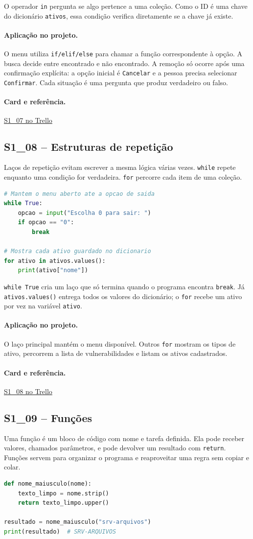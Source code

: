 \documentclass[11pt,a4paper]{article}
\newcommand{\projeto}{\paragraph{Aplicação no projeto.}}
\newcommand{\referencia}[2]{\paragraph{Card e referência.}\href{#1}{#2}}
\newcommand{\cardsection}[1]{\Needspace{12\baselineskip}\subsection{#1}}
\begin{document}
O operador \texttt{in} pergunta se algo pertence a uma coleção. Como o ID é uma chave do dicionário \texttt{ativos}, essa condição verifica diretamente se a chave já existe.

\projeto
O menu utiliza \texttt{if/elif/else} para chamar a função correspondente à opção. A busca decide entre encontrado e não encontrado. A remoção só ocorre após uma confirmação explícita: a opção inicial é \texttt{Cancelar} e a pessoa precisa selecionar \texttt{Confirmar}. Cada situação é uma pergunta que produz verdadeiro ou falso.

\referencia{https://trello.com/c/QvZa8m7a}{S1\_07 no Trello}

\cardsection{S1\_08 -- Estruturas de repetição}

Laços de repetição evitam escrever a mesma lógica várias vezes. \texttt{while} repete enquanto uma condição for verdadeira. \texttt{for} percorre cada item de uma coleção.

\begin{lstlisting}[language=Python,caption={while e for}]
# Mantem o menu aberto ate a opcao de saida
while True:
    opcao = input("Escolha 0 para sair: ")
    if opcao == "0":
        break

# Mostra cada ativo guardado no dicionario
for ativo in ativos.values():
    print(ativo["nome"])
\end{lstlisting}

\texttt{while True} cria um laço que só termina quando o programa encontra \texttt{break}. Já \texttt{ativos.values()} entrega todos os valores do dicionário; o \texttt{for} recebe um ativo por vez na variável \texttt{ativo}.

\projeto
O laço principal mantém o menu disponível. Outros \texttt{for} mostram os tipos de ativo, percorrem a lista de vulnerabilidades e listam os ativos cadastrados.

\referencia{https://trello.com/c/op3s5sKj}{S1\_08 no Trello}

\cardsection{S1\_09 -- Funções}

Uma função é um bloco de código com nome e tarefa definida. Ela pode receber valores, chamados parâmetros, e pode devolver um resultado com \texttt{return}. Funções servem para organizar o programa e reaproveitar uma regra sem copiar e colar.

\begin{lstlisting}[language=Python,caption={Função com parâmetro e retorno}]
def nome_maiusculo(nome):
    texto_limpo = nome.strip()
    return texto_limpo.upper()

resultado = nome_maiusculo("srv-arquivos")
print(resultado)  # SRV-ARQUIVOS
\end{lstlisting}
\end{document}
